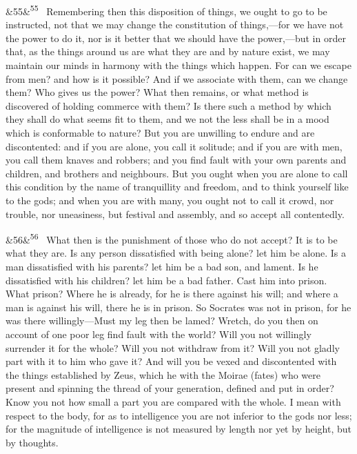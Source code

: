 \documentclass[12pt]{article}
\newcommand{\para}[1][]{\par\noindent\ifx&#1&\else\textsuperscript{\footnotesize #1}~\fi}
\begin{document}
\para[55] Remembering then this disposition of things, we ought to go to be instructed, not that we may change the constitution of things,—for we have not the power to do it, nor is it better that we should have the power,—but in order that, as the things around us are what they are and by nature exist, we may maintain our minds in harmony with the things which happen. For can we escape from men? and how is it possible? And if we associate with them, can we change them? Who gives us the power? What then remains, or what method is discovered of holding commerce with them? Is there such a method by which they shall do what seems fit to them, and we not the less shall be in a mood which is conformable to nature? But you are unwilling to endure and are discontented: and if you are alone, you call it solitude; and if you are with men, you call them knaves and robbers; and you find fault with your own parents and children, and brothers and neighbours. But you ought when you are alone to call this condition by the name of tranquillity and freedom, and to think yourself like to the gods; and when you are with many, you ought not to call it crowd, nor trouble, nor uneasiness, but festival and assembly, and so accept all contentedly.

\para[56] What then is the punishment of those who do not accept? It is to be what they are. Is any person dissatisfied with being alone? let him be alone. Is a man dissatisfied with his parents? let him be a bad son, and lament. Is he dissatisfied with his children? let him be a bad father. Cast him into prison. What prison? Where he is already, for he is there against his will; and where a man is against his will, there he is in prison. So Socrates was not in prison, for he was there willingly—Must my leg then be lamed? Wretch, do you then on account of one poor leg find fault with the world? Will you not willingly surrender it for the whole? Will you not withdraw from it? Will you not gladly part with it to him who gave it? And will you be vexed and discontented with the things established by Zeus, which he with the Moirae (fates) who were present and spinning the thread of your generation, defined and put in order? Know you not how small a part you are compared with the whole. I mean with respect to the body, for as to intelligence you are not inferior to the gods nor less; for the magnitude of intelligence is not measured by length nor yet by height, but by thoughts.
\end{document}
